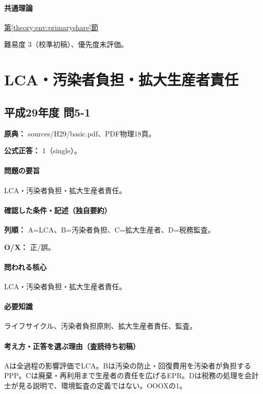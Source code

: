 \paragraph{共通理論} \hyperref[theory:env:primaryshare]{第\ref*{theory:env:primaryshare}節}

\par 難易度 3（校準初稿）、優先度未評価。

\section{LCA・汚染者負担・拡大生産者責任}

\subsection{平成29年度 問5-1}
\label{q:h29-reg-basic-5-1}

\noindent\textbf{原典：} sources/H29/basic.pdf、PDF物理18頁。

\textbf{公式正答：} 1（single）。

\paragraph{問題の要旨} LCA・汚染者負担・拡大生産者責任。

\paragraph{確認した条件・記述（独自要約）}\mbox{}\par

\noindent\textbf{列順：} A=\allowbreak{}LCA、B=汚染者負担、C=拡大生産者、D=税務監査。\par

\noindent\textbf{O/X：} 正/誤。\par

\paragraph{問われる核心} LCA・汚染者負担・拡大生産者責任。

\paragraph{必要知識} ライフサイクル、汚染者負担原則、拡大生産者責任、監査。

\paragraph{考え方・正答を選ぶ理由（査読待ち初稿）} Aは全過程の影響評価でLCA。Bは汚染の防止・回復費用を汚染者が負担するPPP。Cは廃棄・再利用まで生産者の責任を広げるEPR。Dは税務の処理を会計士が見る説明で、環境監査の定義ではない。OOOXの1。

